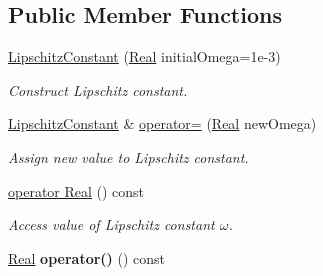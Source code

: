 \subsection*{Public Member Functions}
\begin{DoxyCompactItemize}
\item 
\hyperlink{classSpacy_1_1LipschitzConstant_aa260cc7420e3f5cfc7fe2d78fb2aa7ad}{Lipschitz\+Constant} (\hyperlink{classSpacy_1_1Real}{Real} initial\+Omega=1e-\/3)
\begin{DoxyCompactList}\small\item\em Construct Lipschitz constant. \end{DoxyCompactList}\item 
\hyperlink{classSpacy_1_1LipschitzConstant}{Lipschitz\+Constant} \& \hyperlink{classSpacy_1_1LipschitzConstant_a7f5636d01898427c65555da9b55450dd}{operator=} (\hyperlink{classSpacy_1_1Real}{Real} new\+Omega)
\begin{DoxyCompactList}\small\item\em Assign new value to Lipschitz constant. \end{DoxyCompactList}\item 
\hypertarget{classSpacy_1_1LipschitzConstant_ab62af4397f997ca46374f89f06463a71}{}\hyperlink{classSpacy_1_1LipschitzConstant_ab62af4397f997ca46374f89f06463a71}{operator Real} () const \label{classSpacy_1_1LipschitzConstant_ab62af4397f997ca46374f89f06463a71}

\begin{DoxyCompactList}\small\item\em Access value of Lipschitz constant $\omega$. \end{DoxyCompactList}\item 
\hypertarget{classSpacy_1_1LipschitzConstant_a440e8652f1b67cbcff2ea57a05e7e7b5}{}\hyperlink{classSpacy_1_1Real}{Real} {\bfseries operator()} () const \label{classSpacy_1_1LipschitzConstant_a440e8652f1b67cbcff2ea57a05e7e7b5}


\end{DoxyCompactItemize}
